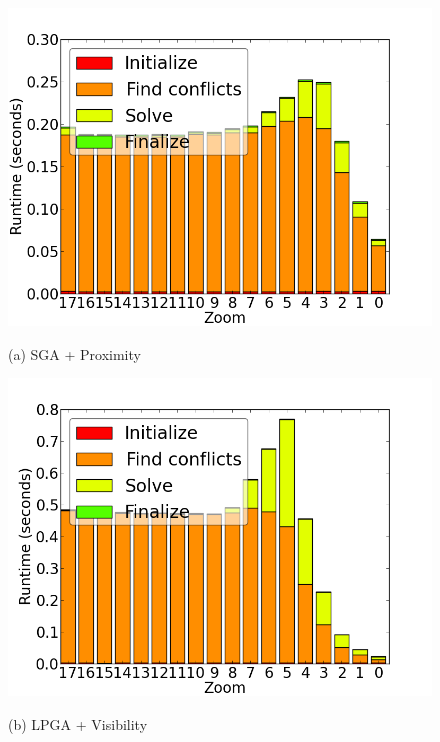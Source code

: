 \begin{figure}[tb]
  \begin{minipage}{0.329\linewidth}
    \centerline{\includegraphics[width=1.0\linewidth]{./figs/prelim_pnt_7k_airports_heuristic_B.png}}
    \centerline{(a) SGA + Proximity}
  \end{minipage} \hfill
  \begin{minipage}{0.329\linewidth}
    \centerline{\includegraphics[width=1.0\linewidth]{./figs/prelim_pnt_7k_airports_lp_A.png}}
    \centerline{(b) LPGA + Visibility}
  \end{minipage} \hfill
  \begin{minipage}{0.329\linewidth}

\end{minipage}
\end{figure}
